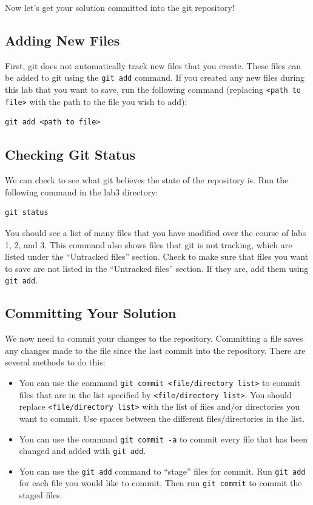 \documentclass[11pt]{article}
\begin{document}
Now let's get your solution committed into the git repository!

\subsection{Adding New Files}
First, git does not automatically track new files that you create.  These files can be added to git using the \verb|git add| command.  If you created any new files during this lab that you want to save, run the following command (replacing \verb|<path to file>| with the path to the file you wish to add):
\begin{verbatim}
git add <path to file>
\end{verbatim}

\subsection{Checking Git Status}
We can check to see what git believes the state of the repository is.  Run the following command in the lab3 directory:
\begin{verbatim}
git status
\end{verbatim}
You should see a list of many files that you have modified over the course of labs 1, 2, and 3.  This command also shows files that git is not tracking, which are listed under the ``Untracked files'' section.  Check to make sure that files you want to save are not listed in the ``Untracked files'' section.  If they are, add them using \verb|git add|.

\subsection{Committing Your Solution}
We now need to commit your changes to the repository.  Committing a file saves any changes made to the file since the last commit into the repository.  There are several methods to do this:
\begin{itemize}
\item You can use the command \verb|git commit <file/directory list>| to commit files that are in the list specified by \verb|<file/directory list>|.  You should replace \verb|<file/directory list>| with the list of files and/or directories you want to commit.  Use spaces between the different files/directories in the list.
\item You can use the command \verb|git commit -a| to commit every file that has been changed and added with \verb|git add|.
\item You can use the \verb|git add| command to ``stage'' files for commit.  Run \verb|git add| for each file you would like to commit.  Then run \verb|git commit| to commit the staged files.
\end{itemize}
\end{document}
